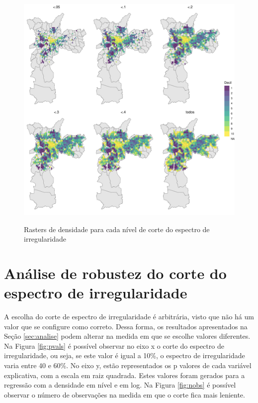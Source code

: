 \begin{apendicesenv}
\begin{figure}[h]
    \centering
    \caption{Rasters de densidade para cada nível de corte do espectro de irregularidade}
    \includegraphics[width = .95\textwidth]{imagens/rasters_densidade.pdf}
    \label{fig:rasters-dens}
\end{figure}




\chapter{Análise de robustez do corte do espectro de irregularidade}
\label{appendix:robustez-corte}

A escolha do corte de espectro de irregularidade é arbitrária, visto que não há um valor que se configure como correto. Dessa forma, os resultados apresentados na Seção \ref{sec:analise} podem alterar na medida em que se escolhe valores diferentes. Na Figura \ref{fig:pvals} é possível observar no eixo x o corte do espectro de irregularidade, ou seja, se este valor é igual a 10\%, o espectro de irregularidade varia entre 40 e 60\%. No eixo y, estão representados os p valores de cada variável explicativa, com a escala em raiz quadrada. Estes valores foram gerados para a regressão com a densidade em nível e em log. Na Figura \ref{fig:nobs} é possível observar o número de observações na medida em que o corte fica mais leniente.


\end{apendicesenv}
